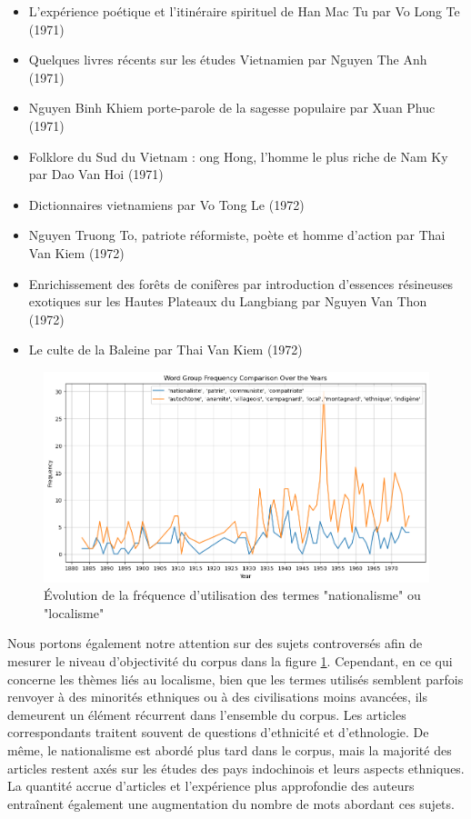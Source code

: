 \begin{itemize}
    \item L’expérience poétique et l’itinéraire spirituel de Han Mac Tu par Vo Long Te (1971)
    \item Quelques livres récents sur les études Vietnamien par Nguyen The Anh (1971)
    \item Nguyen Binh Khiem porte-parole de la sagesse populaire par Xuan Phuc (1971)
    \item Folklore du Sud du Vietnam : ong Hong, l’homme le plus riche de Nam Ky par Dao Van Hoi (1971)
    \item Dictionnaires vietnamiens par Vo Tong Le (1972)
    \item Nguyen Truong To, patriote réformiste, poète et homme d’action par Thai Van Kiem (1972)
    \item Enrichissement des forêts de conifères par introduction d’essences résineuses exotiques sur les Hautes Plateaux du Langbiang par Nguyen Van Thon (1972)
    \item Le culte de la Baleine par Thai Van Kiem (1972)
\end{itemize}

\begin{figure}[H] %
    \centering
    \includegraphics[width=12cm]{img/2.11.national_local.png}
    \caption{Évolution de la fréquence d'utilisation des termes "nationalisme" ou "localisme"}
    \label{fig:national_local}
\end{figure}
Nous portons également notre attention sur des sujets controversés afin de mesurer le niveau d'objectivité du corpus dans la figure \ref{fig:national_local}. Cependant, en ce qui concerne les thèmes liés au localisme, bien que les termes utilisés semblent parfois renvoyer à des minorités ethniques ou à des civilisations moins avancées, ils demeurent un élément récurrent dans l'ensemble du corpus. Les articles correspondants traitent souvent de questions d'ethnicité et d'ethnologie. De même, le nationalisme est abordé plus tard dans le corpus, mais la majorité des articles restent axés sur les études des pays indochinois et leurs aspects ethniques. La quantité accrue d'articles et l'expérience plus approfondie des auteurs entraînent également une augmentation du nombre de mots abordant ces sujets.

